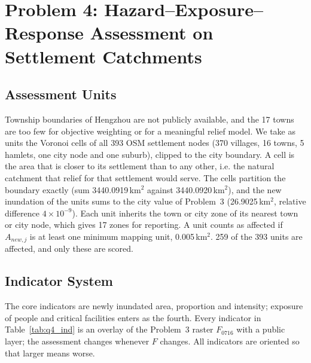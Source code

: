 \section[Problem 4]{Problem 4: Hazard--Exposure--Response Assessment on Settlement Catchments}
\label{sec:q4}

\subsection{Assessment Units}

Township boundaries of Hengzhou are not publicly available, and the 17 towns are too few for objective weighting or for a meaningful relief model. We take as units the Voronoi cells of all 393 OSM settlement nodes (370 villages, 16 towns, 5 hamlets, one city node and one suburb), clipped to the city boundary. A cell is the area that is closer to its settlement than to any other, i.e. the natural catchment that relief for that settlement would serve. The cells partition the boundary exactly (sum 3440.0919\,km$^2$ against 3440.0920\,km$^2$), and the new inundation of the units sums to the city value of Problem~3 (26.9025\,km$^2$, relative difference $4\times10^{-9}$). Each unit inherits the town or city zone of its nearest town or city node, which gives 17 zones for reporting. A unit counts as affected if $A_{new,j}$ is at least one minimum mapping unit, 0.005\,km$^2$. 259 of the 393 units are affected, and only these are scored.

\subsection{Indicator System}

The core indicators are newly inundated area, proportion and intensity; exposure of people and critical facilities enters as the fourth. Every indicator in Table~\ref{tab:q4_ind} is an overlay of the Problem~3 raster $F_{0716}$ with a public layer; the assessment changes whenever $F$ changes. All indicators are oriented so that larger means worse.

